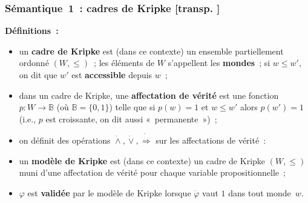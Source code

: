 \documentclass[mathserif,a4paper,aspectratio=169]{beamer}
\newcommand{\itempoint}{\strut\hbox{\color{beamerstructure}\donotcoloroutermaths$\blacktriangleright$}\nobreak\hskip.5em plus.5em\relax}
\newcommand{\dottedlimp}{\mathbin{\dot\Rightarrow}}
\newcommand{\dottedland}{\mathbin{\dot\land}}
\newcommand{\dottedlor}{\mathbin{\dot\lor}}
\newcommand{\dottedtop}{\mathord{\dot\top}}
\newcommand{\dottedbot}{\mathord{\dot\bot}}
\newcommand{\donotcoloroutermaths}{\relax}
\renewcommand{\frametitle}[1]{\subsubsection*{#1 {\footnotesize[transp. \insertframenumber]}}}
\newcommand{\myitemmark}{\hbox{$\blacktriangleright$}}
\renewcommand{\itempoint}{\strut\myitemmark\nobreak\hskip.5em plus.5em\relax}
\begin{document}
\begin{frame}
\frametitle{Sémantique 1 : cadres de Kripke}

\textbf{Définitions :}
\begin{itemize}
\item un \textbf{cadre de Kripke} est {\footnotesize (dans ce
  contexte)} un ensemble partiellement ordonné $(W,\leq)$ ; les
  éléments de $W$ s'appellent les \textbf{mondes} ; si $w\leq w'$, on
  dit que $w'$ est \textbf{accessible} depuis $w$ ;
\item dans un cadre de Kripke, une \textbf{affectation de vérité} est
  une fonction $p\colon W \to \mathbb{B}$ (où $\mathbb{B} = \{0,1\}$)
  telle que si $p(w) = 1$ et $w\leq w'$ alors $p(w') = 1$ (i.e., $p$
  est croissante, on dit aussi « permanente ») ;
\item on définit des opérations $\dottedland, \dottedlor, \dottedlimp$
  sur les affectations de vérité :
\item un \textbf{modèle de Kripke} est {\footnotesize (dans ce
  contexte)} un cadre de Kripke $(W,\leq)$ muni d'une affectation de
  vérité pour chaque variable propositionnelle ;
\item $\varphi$ est \textbf{validée} par le modèle de Kripke lorsque
  $\dot\varphi$ vaut $1$ dans tout monde $w$.
\end{itemize}

\end{frame}
%
\end{document}
